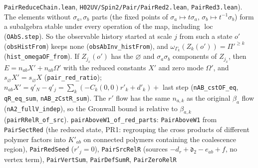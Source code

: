 \documentclass[11pt]{amsart}
\theoremstyle{definition}
\theoremstyle{remark}
\numberwithin{equation}{section}
\begin{document}
\texttt{PairReduceChain.lean}, \texttt{H02UV/Spin2/Pair/PairRed2.lean}, \texttt{PairRed3.lean}). The elements without $\sigma_a,\sigma_b$ parts (the fixed
points of $\sigma_a\mapsto t\sigma_a$, $\sigma_b\mapsto t^{-1}\sigma_b$) form a subalgebra stable under every operation of the map, including
$\operatorname{loc}$ (\texttt{OAbS.step}). So the observable history started at scale $j$ from such a state $o'$ (\texttt{obsHistFrom}) keeps
none (\texttt{obsAbInv\_histFrom}), and $\omega_{\Gamma_k}(Z_k(o'))=\Pi'^{\ge k}$ (\texttt{hist\_omegaOF\_from}). If $Z_{j_x}(o')$ has the
$\varnothing$ and $\sigma_a\sigma_b$ components of $Z_{j_x}$, then $E=n_{ab}X'+n_{ab}\Omega'$ with the reduced constants $X'$ and zero mode
$\Omega'$, and $s_\varnothing X'=s_\varnothing X$ (\texttt{pair\_red\_ratio}); $n_{ab}X'=q'_N-q'_{j}=\sum_k(-C_k(0,0)r'_k+d'_k)+$ last step
(\texttt{nAB\_cstOF\_eq}, \texttt{qR\_eq\_sum}, \texttt{nAB\_zCstR\_sum}). The $r'$ flow has the same $n_{a,k}$ as the original $\beta_a$ flow
(\texttt{nA2\_fullV\_indep}), so the Gronwall bound is relative to $\beta_{a,k}$ (\texttt{pairRRelR\_of\_src}). \texttt{pairAboveW1\_of\_red\_parts}:
\texttt{PairAboveW1} from \texttt{PairSectRed} (the reduced state, PR1: regrouping the cross products of different polymer factors into
$K'_{ab}$ on connected polymers containing the coalescence region), \texttt{PairRedSeed} ($r'_j=0$), \texttt{PairSrcRelR} (sources
$-d_r+\mathfrak d_2-e_{ab}+f$, no vertex term), \texttt{PairVertSum}, \texttt{PairDefSumR}, \texttt{PairZeroRelR}
\end{document}
